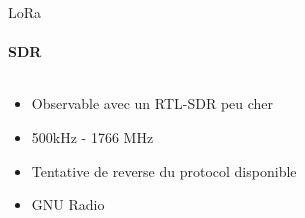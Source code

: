 \begin{frame}{LoRa}
\framesubtitle{SDR}
\begin{columns}
  \begin{column}{0.5\textwidth}
  \begin{itemize}
    \item Observable avec un RTL-SDR peu cher
    \item 500kHz - 1766 MHz
    \item Tentative de reverse du protocol disponible
    \item GNU Radio
  \end{itemize}
  \end{column}
  \begin{column}{0.5\textwidth}
   \begin{center}
  \end{center}
  \end{column}
\end{columns}

\end{frame}

